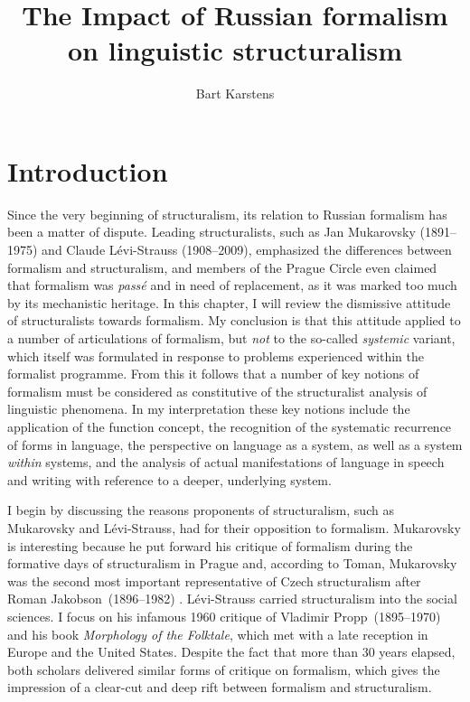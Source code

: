 \documentclass[output=paper]{langscibook}
\author{Bart Karstens \affiliation{Vrije Universiteit Amsterdam}}
\title{The Impact of Russian formalism on linguistic structuralism}
\begin{document}
\maketitle

\section{Introduction} 
\label{sec:karstens:intro}

Since the very beginning of structuralism, its relation to Russian formalism has been a matter of dispute. Leading structuralists, such as Jan Mukarovsky (1891--1975) and Claude Lévi-Strauss (1908--2009), emphasized the differences between formalism and structuralism, and members of the Prague Circle even claimed that formalism was \emph{passé} and in need of replacement, as it was marked too much by its mechanistic heritage. In this chapter, I will review the dismissive attitude of structuralists towards formalism. My conclusion is that this attitude applied to a number of articulations of formalism, but \emph{not} to the so-called \emph{systemic} variant, which itself was formulated in response to problems experienced within the formalist programme. From this it follows that a number of key notions of formalism must be considered as constitutive of the structuralist analysis of linguistic phenomena. In my interpretation these key notions include the application of the function concept, the recognition of the systematic recurrence of forms in language, the perspective on language as a system, as well as a system \emph{within} systems, and the analysis of actual manifestations of language in speech and writing with reference to a deeper, underlying system.

I begin by discussing the reasons proponents of structuralism, such as Mukarovsky and Lévi-Strauss, had for their opposition to formalism. Mukarovsky is interesting because he put forward his critique of formalism during the formative days of structuralism in Prague and, according to Toman, Mukarovsky was the second most important representative of Czech structuralism after Roman Jakobson~(1896--1982) \citep[128]{Toman1995}. Lévi-Strauss carried structuralism into the social sciences. I focus on his infamous 1960 critique of Vladimir Propp~(1895--1970) and his \citeyear{Propp1928} book \emph{Morphology of the Folktale}, which met with a late reception in Europe and the United States. Despite the fact that more than 30 years elapsed, both scholars delivered similar forms of critique on formalism, which gives the impression of a clear-cut and deep rift between formalism and structuralism.  
\end{document}
